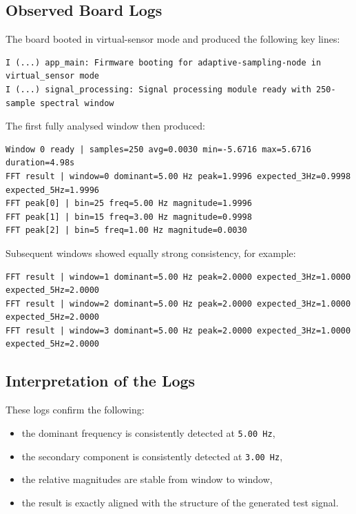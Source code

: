 \documentclass[12pt,a4paper]{article}
\begin{document}
\subsection{Observed Board Logs}

The board booted in virtual-sensor mode and produced the following key lines:

\begin{lstlisting}
I (...) app_main: Firmware booting for adaptive-sampling-node in virtual_sensor mode
I (...) signal_processing: Signal processing module ready with 250-sample spectral window
\end{lstlisting}

The first fully analysed window then produced:

\begin{lstlisting}
Window 0 ready | samples=250 avg=0.0030 min=-5.6716 max=5.6716 duration=4.98s
FFT result | window=0 dominant=5.00 Hz peak=1.9996 expected_3Hz=0.9998 expected_5Hz=1.9996
FFT peak[0] | bin=25 freq=5.00 Hz magnitude=1.9996
FFT peak[1] | bin=15 freq=3.00 Hz magnitude=0.9998
FFT peak[2] | bin=5 freq=1.00 Hz magnitude=0.0030
\end{lstlisting}

Subsequent windows showed equally strong consistency, for example:

\begin{lstlisting}
FFT result | window=1 dominant=5.00 Hz peak=2.0000 expected_3Hz=1.0000 expected_5Hz=2.0000
FFT result | window=2 dominant=5.00 Hz peak=2.0000 expected_3Hz=1.0000 expected_5Hz=2.0000
FFT result | window=3 dominant=5.00 Hz peak=2.0000 expected_3Hz=1.0000 expected_5Hz=2.0000
\end{lstlisting}

\subsection{Interpretation of the Logs}

These logs confirm the following:

\begin{itemize}
    \item the dominant frequency is consistently detected at \texttt{5.00 Hz},
    \item the secondary component is consistently detected at \texttt{3.00 Hz},
    \item the relative magnitudes are stable from window to window,
    \item the result is exactly aligned with the structure of the generated
    test signal.
\end{itemize}
\end{document}
